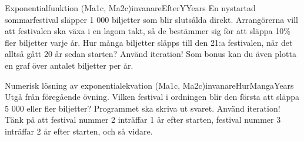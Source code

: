 \begin{matteovning}{Exponentialfunktion (Ma1c, Ma2c)}{invanareEfterYYears}
En nystartad sommarfestival släpper 1 000 biljetter som blir slutsålda direkt. Arrangörerna vill att festivalen ska växa i en lagom takt, så de bestämmer sig för att släppa 10\% fler biljetter varje år. Hur många biljetter släpps till den 21:a festivalen, när det alltså gått 20 år sedan starten? Använd iteration! Som bonus kan du även plotta en graf över antalet biljetter per år.
\end{matteovning}

\begin{matteovning}{Numerisk lösning av exponentialekvation (Ma1c, Ma2c)}{invanareHurMangaYears}
Utgå från föregående övning. Vilken festival i ordningen blir den första att släppa 5 000 eller fler biljetter? Programmet ska skriva ut svaret. Använd iteration! Tänk på att festival nummer 2 inträffar 1 år efter starten, festival nummer 3 inträffar 2 år efter starten, och så vidare.
\end{matteovning}



